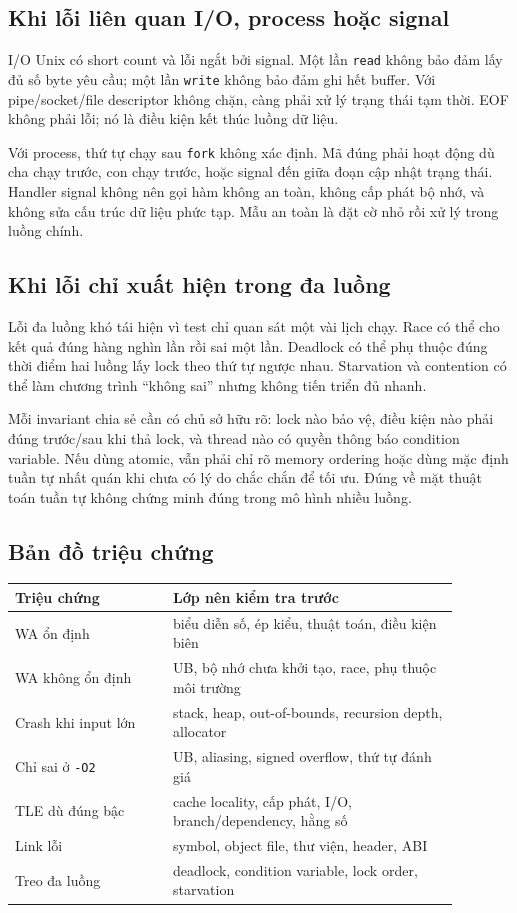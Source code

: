 \documentclass[11pt]{article}
\begin{document}
\subsection{Khi lỗi liên quan I/O, process hoặc signal}

I/O Unix có short count và lỗi ngắt bởi signal. Một lần \texttt{read} không bảo
đảm lấy đủ số byte yêu cầu; một lần \texttt{write} không bảo đảm ghi hết buffer.
Với pipe/socket/file descriptor không chặn, càng phải xử lý trạng thái tạm thời.
EOF không phải lỗi; nó là điều kiện kết thúc luồng dữ liệu.

Với process, thứ tự chạy sau \texttt{fork} không xác định. Mã đúng phải hoạt
động dù cha chạy trước, con chạy trước, hoặc signal đến giữa đoạn cập nhật trạng
thái. Handler signal không nên gọi hàm không an toàn, không cấp phát bộ nhớ, và
không sửa cấu trúc dữ liệu phức tạp. Mẫu an toàn là đặt cờ nhỏ rồi xử lý trong
luồng chính.

\subsection{Khi lỗi chỉ xuất hiện trong đa luồng}

Lỗi đa luồng khó tái hiện vì test chỉ quan sát một vài lịch chạy. Race có thể
cho kết quả đúng hàng nghìn lần rồi sai một lần. Deadlock có thể phụ thuộc đúng
thời điểm hai luồng lấy lock theo thứ tự ngược nhau. Starvation và contention có
thể làm chương trình ``không sai'' nhưng không tiến triển đủ nhanh.

Mỗi invariant chia sẻ cần có chủ sở hữu rõ: lock nào bảo vệ, điều kiện nào phải
đúng trước/sau khi thả lock, và thread nào có quyền thông báo condition
variable. Nếu dùng atomic, vẫn phải chỉ rõ memory ordering hoặc dùng mặc định
tuần tự nhất quán khi chưa có lý do chắc chắn để tối ưu. Đúng về mặt thuật toán
tuần tự không chứng minh đúng trong mô hình nhiều luồng.

\subsection{Bản đồ triệu chứng}

\begin{center}
\begin{tabular}{p{0.31\linewidth}p{0.57\linewidth}}
\textbf{Triệu chứng} & \textbf{Lớp nên kiểm tra trước} \\
\hline
WA ổn định & biểu diễn số, ép kiểu, thuật toán, điều kiện biên \\
WA không ổn định & UB, bộ nhớ chưa khởi tạo, race, phụ thuộc môi trường \\
Crash khi input lớn & stack, heap, out-of-bounds, recursion depth, allocator \\
Chỉ sai ở \texttt{-O2} & UB, aliasing, signed overflow, thứ tự đánh giá \\
TLE dù đúng bậc & cache locality, cấp phát, I/O, branch/dependency, hằng số \\
Link lỗi & symbol, object file, thư viện, header, ABI \\
Treo đa luồng & deadlock, condition variable, lock order, starvation \\
\end{tabular}
\end{center}
\end{document}
